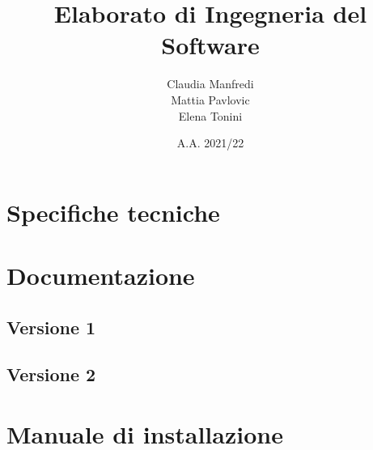 \documentclass{report}
\title{Elaborato di Ingegneria del Software}
\author{Claudia Manfredi\\Mattia Pavlovic\\Elena Tonini}
\date{A.A. 2021/22}
\begin{document}
\maketitle
\tableofcontents

\chapter{Specifiche tecniche}


\chapter{Documentazione}

\section{Versione 1}





\cleardoublepage
\section{Versione 2}





%
%
%
%
%
%
%
%
%
%
%
%
%
%
%
%
%
%

\chapter{Manuale di installazione}

%
%
%

%
\end{document}
